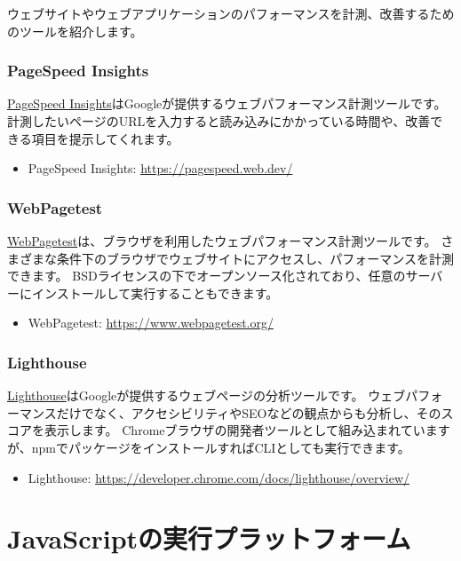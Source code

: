ウェブサイトやウェブアプリケーションのパフォーマンスを計測、改善するためのツールを紹介します。

\hypertarget{pagespeed}{%
\subsubsection{PageSpeed Insights}\label{pagespeed}}

\href{https://pagespeed.web.dev/}{PageSpeed
Insights}はGoogleが提供するウェブパフォーマンス計測ツールです。
計測したいページのURLを入力すると読み込みにかかっている時間や、改善できる項目を提示してくれます。
\begin{itemize}
\item PageSpeed Insights: \url{https://pagespeed.web.dev/}
\end{itemize}

\hypertarget{webpagetest}{%
\subsubsection{WebPagetest}\label{webpagetest}}

\href{https://www.webpagetest.org/}{WebPagetest}は、ブラウザを利用したウェブパフォーマンス計測ツールです。
さまざまな条件下のブラウザでウェブサイトにアクセスし、パフォーマンスを計測できます。
BSDライセンスの下でオープンソース化されており、任意のサーバーにインストールして実行することもできます。
\begin{itemize}
\item WebPagetest: \url{https://www.webpagetest.org/}
\end{itemize}

\hypertarget{lighthouse}{%
\subsubsection{Lighthouse}\label{lighthouse}}

\href{https://developer.chrome.com/docs/lighthouse/overview/}{Lighthouse}はGoogleが提供するウェブページの分析ツールです。
ウェブパフォーマンスだけでなく、アクセシビリティやSEOなどの観点からも分析し、そのスコアを表示します。
Chromeブラウザの開発者ツールとして組み込まれていますが、npmでパッケージをインストールすればCLIとしても実行できます。
\begin{itemize}
\item Lighthouse: \url{https://developer.chrome.com/docs/lighthouse/overview/}
\end{itemize}

\hypertarget{javascript-platform}{%
\section{JavaScriptの実行プラットフォーム}\label{javascript-platform}}

